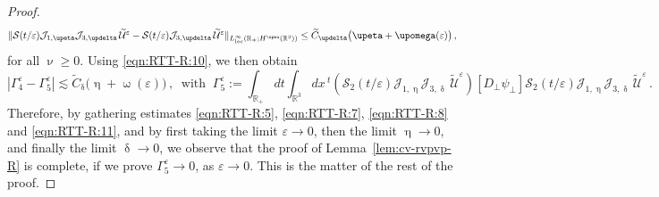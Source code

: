 \documentclass[11pt,reqno]{amsart}
\def \R{{\mathbb{R}}}
\begin{document}
\begin{proof}
  \begin{equation}
    \label{eqn:RTT-R:10}
    \| \mathcal S(t/\varepsilon) \mathcal J_{1,\upeta} \mathcal J_{3,\updelta} \,\widetilde{\mathcal U}^\varepsilon  -
    \mathcal S(t/\varepsilon) \mathcal J_{3,\updelta} \,\widetilde{\mathcal U}^\varepsilon
    \|_{L_{\rm loc}^\infty(\R_+; H^{\upnu}(\R^3))} \leq \widetilde{C}_\updelta \big( \upeta + \upomega(\varepsilon) \big)\,,
  \end{equation}
  for all $\upnu \geq 0$. Using \eqref{eqn:RTT-R:10}, we then obtain
  \begin{equation}
    \label{eqn:RTT-R:11}
    |\Gamma_4^\varepsilon -\Gamma_5^\varepsilon| \lesssim \widetilde{C}_\updelta \big( \upeta + \upomega(\varepsilon) \big)\,, 
    \ \mbox{ with } \
    \Gamma_5^\varepsilon:=   \int_{\R_+} dt \int_{\R^3}dx\, {}^t(\mathcal S_2(t/\varepsilon) \mathcal J_{1,\upeta} \mathcal J_{3,\updelta} \,\widetilde{\mathcal U}^\varepsilon)[D_\perp \psi_\perp] \mathcal S_2(t/\varepsilon) \mathcal J_{1,\upeta} \mathcal J_{3,\updelta} \,\widetilde{\mathcal U}^\varepsilon\,. 
  \end{equation}   
  Therefore, by gathering estimates \eqref{eqn:RTT-R:5}, \eqref{eqn:RTT-R:7}, \eqref{eqn:RTT-R:8} and \eqref{eqn:RTT-R:11}, and by first taking the limit $\varepsilon \rightarrow 0$, then the limit $\upeta \rightarrow 0$, and finally the limit $\updelta \rightarrow 0$, we observe that the proof of Lemma~\ref{lem:cv-rvpvp-R} is complete, if we  prove $\Gamma_5^\varepsilon \rightarrow 0$, as $\varepsilon \rightarrow 0$. This is the matter of the rest of the proof.


\end{proof}
\end{document}

